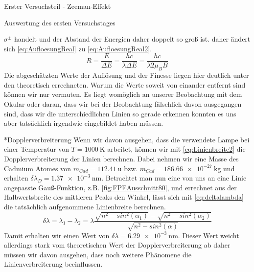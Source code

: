 \documentclass[pdftex, a4paper,11pt, twoside, ngerman]{report}
\begin{document}
\begin{chapter}{Erster Versuchsteil - Zeeman-Effekt}
\begin{section}{Auswertung des ersten Versuchstages}
\begin{subsection}
        $\sigma^{\pm}$ handelt und der Abstand der Energien daher doppelt so
        groß ist. daher ändert sich \cref{eq:AufloesungReal} zu
        \cref{eq:AufloesungReal2}.
        \begin{equation}
          \label{eq:AufloesungReal2}
          R=\frac{E}{\Delta E}=\frac{hc}{\lambda\Delta E} = 
          \frac{hc}{\lambda2\mu_{B}B}
        \end{equation}
        \newline
        Die abgeschätzten Werte der Auflösung und der Finesse liegen hier
        deutlich unter den theoretisch errechneten. Warum die Werte soweit von
        einander entfernt sind können wir nur vermuten. Es liegt womöglich
        an unserer Beobachtung mit dem Okular oder daran, dass wir bei der
        Beobachtung fälschlich davon ausgegangen sind, dass wir die
        unterschiedlichen Linien so gerade erkennen konnten es uns aber
        tatsächlich irgendwie eingebildet haben müssen.
        
        \begin{subsubsection}*{Dopplerverbreiterung}
          Wenn wir davon ausgehen, dass die verwendete Lampe bei einer
          Temperatur von $T=\SI{1000}{\kelvin}$ arbeitet, können wir mit
          \cref{eq:Linienbreite2} die Dopplerverbreiterung der Linien berechnen.
          Dabei nehmen wir eine Masse des Cadmium Atomes von
          $m_{Cad}=\SI{112.41}{\atomicmassunit}$ bzw.
          $m_{Cad}=\SI{186.66e-27}{\kilo\gram}$ und erhalten
          $\delta\lambda_{D}=\SI{1.37e-3}{\nano\meter}$. \newline
          Betrachtet man nun eine von uns an eine Linie angepasste
          Gauß-Funktion, z.B. \cref{fig:FPEAusschnitt80}, und errechnet aus der
          Halbwertsbreite des mittleren Peaks den Winkel, lässt sich mit
          \cref{eq:deltalambda} die tatsächlich aufgenommene Linienbreite
          berechnen.
          \begin{equation}
            \label{eq:deltalambda}
            \delta\lambda = \lambda_{1}-\lambda_{2} = \lambda
            \frac{\sqrt{n^{2}-sin^{2}(\alpha_{1})}-\sqrt{n^{2}-sin^{2}
            (\alpha_{2})}}{\sqrt{n^{2}-sin^{2}(\alpha)}}
          \end{equation}
          \newline
          Damit erhalten wir einen Wert von 
          $\delta\lambda=\SI{6.29e-3}{\nano\meter}$. Dieser Wert weicht
          allerdings stark vom theoretischen Wert der Dopplerverbreiterung ab
          daher müssen wir davon ausgehen, dass noch weitere Phänomene die
          Linienverbreiterung beeinflussen.
          

\end{subsubsection}
\end{subsection}
\end{section}
\end{chapter}
\end{document}
